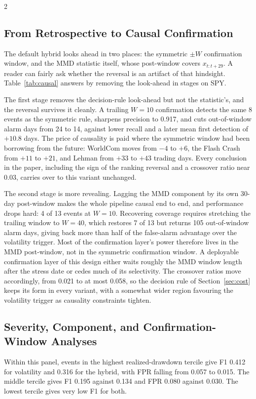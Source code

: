 \documentclass{book}
\begin{document}
\begin{multicols}{2}
\subsection{From Retrospective to Causal Confirmation}
\label{sec:causal}
The default hybrid looks ahead in two places: the symmetric $\pm W$ confirmation window, and the MMD statistic itself, whose post-window covers $x_{t:t+29}$. A reader can fairly ask whether the reversal is an artifact of that hindsight. Table~\ref{tab:causal} answers by removing the look-ahead in stages on SPY.

The first stage removes the decision-rule look-ahead but not the statistic's, and the reversal survives it cleanly. A trailing $W=10$ confirmation detects the same 8 events as the symmetric rule, sharpens precision to 0.917, and cuts out-of-window alarm days from 24 to 14, against lower recall and a later mean first detection of $+10.8$ days. The price of causality is paid where the symmetric window had been borrowing from the future: WorldCom moves from $-4$ to $+6$, the Flash Crash from $+11$ to $+21$, and Lehman from $+33$ to $+43$ trading days. Every conclusion in the paper, including the sign of the ranking reversal and a crossover ratio near 0.03, carries over to this variant unchanged.

The second stage is more revealing. Lagging the MMD component by its own 30-day post-window makes the whole pipeline causal end to end, and performance drops hard: 4 of 13 events at $W=10$. Recovering coverage requires stretching the trailing window to $W=40$, which restores 7 of 13 but returns 105 out-of-window alarm days, giving back more than half of the false-alarm advantage over the volatility trigger. Most of the confirmation layer's power therefore lives in the MMD post-window, not in the symmetric confirmation window. A deployable confirmation layer of this design either waits roughly the MMD window length after the stress date or cedes much of its selectivity. The crossover ratios move accordingly, from 0.021 to at most 0.058, so the decision rule of Section~\ref{sec:cost} keeps its form in every variant, with a somewhat wider region favouring the volatility trigger as causality constraints tighten.

\subsection{Severity, Component, and Confirmation-Window Analyses}
Within this panel, events in the highest realized-drawdown tercile give F1 0.412 for volatility and 0.316 for the hybrid, with FPR falling from 0.057 to 0.015. The middle tercile gives F1 0.195 against 0.134 and FPR 0.080 against 0.030. The lowest tercile gives very low F1 for both.


\end{multicols}
\end{document}
